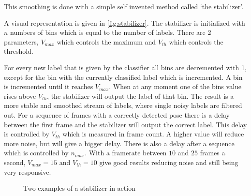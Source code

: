 This smoothing is done with a simple self invented method called `the stabilizer'.

A visual representation is given in \autoref{fig:stabilizer}. The stabilizer is initialized with $n$ numbers of bins which is equal to the number of labels. There are 2 parameters, $V_{max}$ which controls the maximum and $V_{th}$ which controls the threshold.

For every new label that is given by the classifier all bins are decremented with 1, except for the bin with the currently classified label which is incremented. A bin is incremented until it reaches $V_{max}$. When at any moment one of the bins value rises above $V_{th}$, the stabilizer will output the label of that bin. The result is a more stable and smoothed stream of labels, where single noisy labels are filtered out. For a sequence of frames with a correctly detected pose there is a delay between the first frame and the stabilizer will output the correct label. This delay is controlled by $V_{th}$ which is measured in frame count. A higher value will reduce more noise, but will give a bigger delay. There is also a delay after a sequence which is controlled by $n_{max}$. With a framerate between $10$ and $25$ frames a second, $V_{max} = 15$ and $V_{th} = 10$ give good results reducing noise and still being very responsive.

\begin{figure}[tb]
  \centering
{}
\hspace{0.03\linewidth}
  \caption{Two examples of a stabilizer in action}
  \label{fig:stabilizer}
\end{figure}

